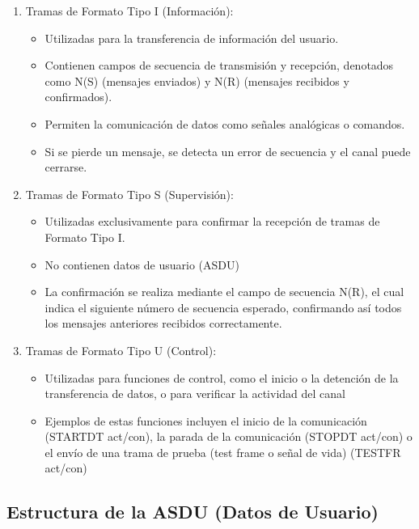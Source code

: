 \documentclass[a5paper]{book}%
\begin{document}
\begin{enumerate}
\item Tramas de Formato Tipo I (Información):
  \begin{itemize}
  \item Utilizadas para la transferencia de información del usuario.
  \item Contienen campos de secuencia de transmisión y recepción, denotados como N(S) (mensajes enviados) y N(R) (mensajes recibidos y confirmados).
  \item Permiten la comunicación de datos como señales analógicas o comandos.
  \item Si se pierde un mensaje, se detecta un error de secuencia y el canal puede cerrarse.
    \end{itemize}

\item Tramas de Formato Tipo S (Supervisión):
\begin{itemize}
\item Utilizadas exclusivamente para confirmar la recepción de tramas de Formato Tipo I.
\item No contienen datos de usuario (ASDU)
\item La confirmación se realiza mediante el campo de secuencia N(R), el cual indica el siguiente número de secuencia esperado, confirmando así todos los mensajes anteriores recibidos correctamente.
\end{itemize}

\item Tramas de Formato Tipo U (Control):
  \begin{itemize}
  \item Utilizadas para funciones de control, como el inicio o la detención de la transferencia de datos, o para verificar la actividad del canal
  \item Ejemplos de estas funciones incluyen el inicio de la comunicación (STARTDT act/con), la parada de la comunicación (STOPDT act/con) o el envío de una trama de prueba (test frame o señal de vida) (TESTFR act/con)
  \end{itemize}
  
\end{enumerate}


\subsection{Estructura de la ASDU (Datos de Usuario)}
\end{document}
